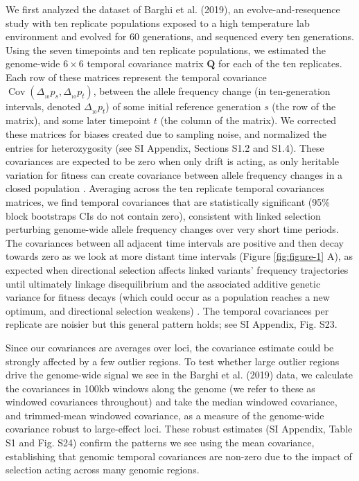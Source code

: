 \documentclass[9pt,twocolumn,twoside]{pnas-new}
\DeclareMathOperator{\cov}{Cov}
\begin{document}
We first analyzed the dataset of Barghi et al. (2019), an evolve-and-resequence
study with ten replicate populations exposed to a high temperature lab
environment and evolved for 60 generations, and sequenced every ten
generations. Using the seven timepoints and ten replicate populations, we
estimated the genome-wide $6 \times 6$ temporal covariance matrix $\mathbf{Q}$
for each of the ten replicates. Each row of these matrices represent the
temporal covariance $\cov(\Delta_{_{10}} p_s, \Delta_{_{10}} p_t)$, between the
allele frequency change (in ten-generation intervals, denoted $\Delta_{_{10}}
p_t$) of some initial reference generation $s$ (the row of the matrix), and
some later timepoint $t$ (the column of the matrix). We corrected these
matrices for biases created due to sampling noise, and normalized the entries
for heterozygosity (see SI Appendix, Sections S1.2 and S1.4). These covariances
are expected to be zero when only drift is acting, as only heritable variation
for fitness can create covariance between allele frequency changes in a closed
population \cite{Buffalo2019-io}.  Averaging across the ten replicate temporal
covariances matrices, we find temporal covariances that are statistically
significant (95\% block bootstraps CIs do not contain zero), consistent with
linked selection perturbing genome-wide allele frequency changes over very
short time periods.  The covariances between all adjacent time intervals are
positive and then decay towards zero as we look at more distant time intervals
(Figure \ref{fig:figure-1} A), as expected when directional selection affects
linked variants' frequency trajectories until ultimately linkage disequilibrium
and the associated additive genetic variance for fitness decays (which could
occur as a population reaches a new optimum, and directional selection weakens)
\cite{Buffalo2019-io}. The temporal covariances per replicate are noisier but
this general pattern holds; see SI Appendix, Fig. S23.

Since our covariances are averages over loci, the covariance estimate could be
strongly affected by a few outlier regions. To test whether large outlier
regions drive the genome-wide signal we see in the Barghi et al. (2019) data,
we calculate the covariances in 100kb windows along the genome (we refer to
these as windowed covariances throughout) and take the median windowed
covariance, and trimmed-mean windowed covariance, as a measure of the
genome-wide covariance robust to large-effect loci. These robust estimates (SI
Appendix, Table S1 and Fig. S24) confirm the patterns we see using the mean
covariance, establishing that genomic temporal covariances are non-zero due to
the impact of selection acting across many genomic regions. 
\end{document}
